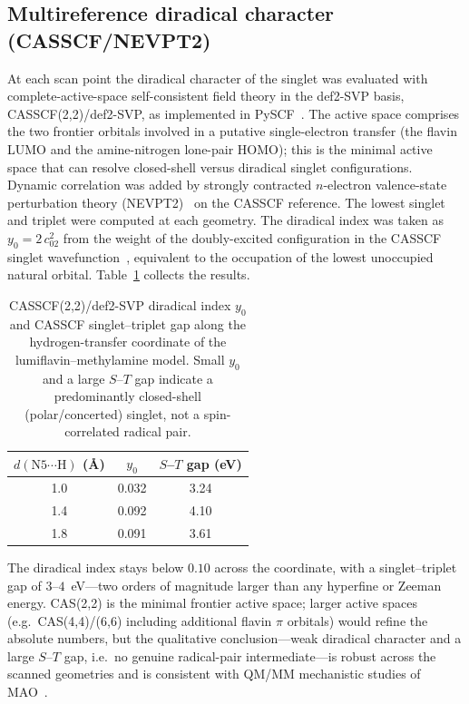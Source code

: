 \documentclass[11pt]{article}
\begin{document}
\subsection{Multireference diradical character (CASSCF/NEVPT2)}
At each scan point the diradical character of the singlet was evaluated with
complete-active-space self-consistent field theory in the def2-SVP basis,
CASSCF(2,2)/def2-SVP, as implemented in PySCF~\cite{Sun2020}. The active space
comprises the two frontier orbitals involved in a putative single-electron
transfer (the flavin LUMO and the amine-nitrogen lone-pair HOMO); this is the
minimal active space that can resolve closed-shell versus diradical singlet
configurations. Dynamic correlation was added by strongly contracted
$n$-electron valence-state perturbation theory (NEVPT2)~\cite{Angeli2001} on the
CASSCF reference. The lowest singlet and triplet were computed at each geometry.
The diradical index was taken as $y_0 = 2\,c_{02}^{2}$ from the weight of the
doubly-excited configuration in the CASSCF singlet
wavefunction~\cite{Nakano2017}, equivalent to the occupation of the lowest
unoccupied natural orbital. Table~\ref{tab:casscf} collects the results.

\begin{table}[h]
\centering
\caption{CASSCF(2,2)/def2-SVP diradical index $y_0$ and CASSCF
singlet--triplet gap along the hydrogen-transfer coordinate of the
lumiflavin--methylamine model. Small $y_0$ and a large $S$--$T$ gap indicate a
predominantly closed-shell (polar/concerted) singlet, not a spin-correlated
radical pair.}
\label{tab:casscf}
\begin{tabular}{c c c}
\toprule
$d(\mathrm{N5}\cdots\mathrm{H})$ (\AA) & $y_0$ & $S$--$T$ gap (eV) \\
\midrule
1.0 & 0.032 & 3.24 \\
1.4 & 0.092 & 4.10 \\
1.8 & 0.091 & 3.61 \\
\bottomrule
\end{tabular}
\end{table}

The diradical index stays below $0.10$ across the coordinate, with a
singlet--triplet gap of $3$--$4$~eV---two orders of magnitude larger than any
hyperfine or Zeeman energy. CAS(2,2) is the minimal frontier active space;
larger active spaces (e.g.\ CAS(4,4)/(6,6) including additional flavin
$\pi$ orbitals) would refine the absolute numbers, but the qualitative
conclusion---weak diradical character and a large $S$--$T$ gap, i.e.\ no genuine
radical-pair intermediate---is robust across the scanned geometries and is
consistent with QM/MM mechanistic studies of MAO~\cite{Repic2013,Vianello2012}.
\end{document}
